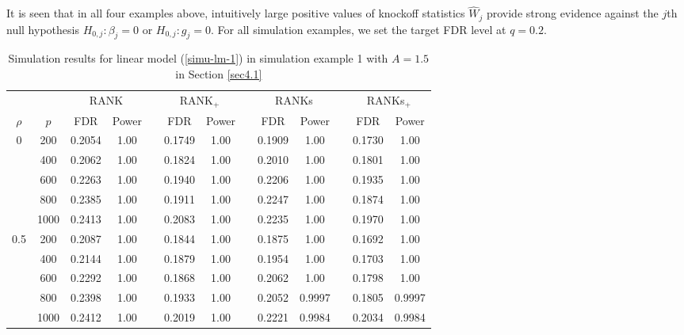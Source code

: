 \documentclass[11pt]{article}
\newcommand{\wh}{\widehat}
\begin{document}
It is seen that in all four examples above, intuitively large positive values of knockoff statistics $\wh W_j$ provide strong evidence against the $j$th null hypothesis $H_{0, j}: \beta_j = 0$ or $H_{0, j}: g_j = 0$. For all simulation examples, we set the target FDR level at $q = 0.2$.


\begin{table}[htp!]
	\centering
	\caption{\label{tab1} Simulation results for linear model (\ref{simu-lm-1}) in simulation example 1 with $A=1.5$ in Section \ref{sec4.1}}
	\vskip0.2cm
	\tabcolsep 0.15cm
	\begin{tabular}{ccccccccccccc}
		\toprule
	&	&  \multicolumn{2}{c}{RANK}&&\multicolumn{2}{c}{RANK$_+$} &&\multicolumn{2}{c}{RANKs}&&\multicolumn{2}{c}{RANKs$_+$}     \\
		\cline{3-4}\cline{6-7}\cline{9-10}\cline{12-13}
$\rho$	&	$ p$ &FDR & Power &  & FDR& Power && FDR & Power &  & FDR& Power  \\
		\hline
0&		200 & 0.2054 & 1.00 && 0.1749 & 1.00 &&0.1909  & 1.00   && 0.1730 & 1.00 \\
	&	400 & 0.2062 & 1.00 && 0.1824 & 1.00 && 0.2010 & 1.00   && 0.1801 & 1.00 \\
	&	600 & 0.2263 & 1.00 &&0.1940  & 1.00 && 0.2206 & 1.00   && 0.1935 & 1.00 \\
	&	800 & 0.2385 & 1.00 &&0.1911  & 1.00 &&0.2247  & 1.00   &&0.1874  & 1.00 \\
        & 1000    & 0.2413 & 1.00 &&0.2083  & 1.00 &&0.2235  & 1.00   &&0.1970  & 1.00 \\
0.5   &    200   & 0.2087 & 1.00 &&0.1844  & 1.00 && 0.1875 & 1.00   && 0.1692 & 1.00  \\
	&	400 & 0.2144 & 1.00 &&0.1879  & 1.00 &&0.1954  &1.00    && 0.1703 & 1.00 \\
	&	600 & 0.2292 & 1.00 &&0.1868  & 1.00 &&0.2062  & 1.00   && 0.1798 & 1.00  \\
	&	800 & 0.2398 & 1.00 &&0.1933  & 1.00 &&0.2052  &0.9997&& 0.1805 &0.9997 \\
        & 1000    & 0.2412 & 1.00 &&0.2019  & 1.00 &&0.2221  &0.9984&& 0.2034 &0.9984 \\
		\bottomrule
	\end{tabular}
\end{table}
\end{document}
